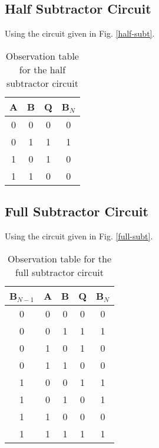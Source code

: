 \subsection{Half Subtractor Circuit}

\noindent Using the circuit given in Fig. \ref{half-subt}.
\begin{table}[H]
    \centering
    \begin{tabular}{|c|c|c|c|}\hline
        A & B & Q & B$_N$ \\ \hline
        0 & 0 & 0 & 0 \\ 
        0 & 1 & 1 & 1 \\ 
        1 & 0 & 1 & 0 \\ 
        1 & 1 & 0 & 0 \\ \hline
    \end{tabular}
    \caption{Observation table for the half subtractor circuit}
\end{table}

\subsection{Full Subtractor Circuit}

\noindent Using the circuit given in Fig. \ref{full-subt}.
\begin{table}[H]
    \centering
    \begin{tabular}{|c|c|c|c|c|}\hline
        B$_{N-1}$ & A & B & Q & B$_N$ \\ \hline
        0 & 0 & 0 & 0 & 0 \\ 
        0 & 0 & 1 & 1 & 1 \\ 
        0 & 1 & 0 & 1 & 0 \\ 
        0 & 1 & 1 & 0 & 0 \\
        1 & 0 & 0 & 1 & 1 \\ 
        1 & 0 & 1 & 0 & 1 \\ 
        1 & 1 & 0 & 0 & 0 \\ 
        1 & 1 & 1 & 1 & 1 \\ \hline
    \end{tabular}
    \caption{Observation table for the full subtractor circuit}
\end{table}

\newpage
